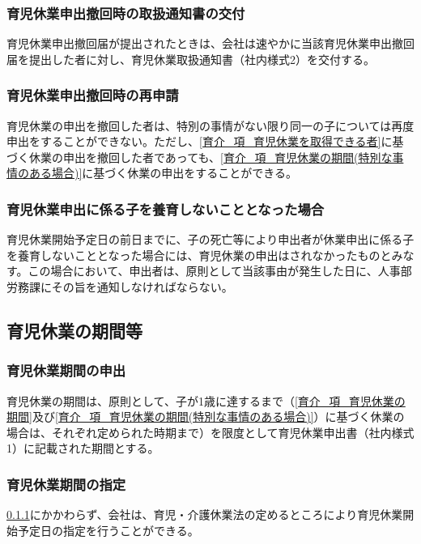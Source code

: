 \documentclass{jsarticle}
\begin{document}
\subsubsection{育児休業申出撤回時の取扱通知書の交付}
\label{育介_項_育児休業申出撤回時の取扱通知書の交付}
育児休業申出撤回届が提出されたときは、会社は速やかに当該育児休業申出撤回届を提出した者に対し、育児休業取扱通知書（社内様式2）を交付する。

\subsubsection{育児休業申出撤回時の再申請}
\label{育介_項_育児休業申出撤回時の再申請}
育児休業の申出を撤回した者は、特別の事情がない限り同一の子については再度申出をすることができない。ただし、\ref{育介_項_育児休業を取得できる者}に基づく休業の申出を撤回した者であっても、\ref{育介_項_育児休業の期間(特別な事情のある場合)}に基づく休業の申出をすることができる。

\subsubsection{育児休業申出に係る子を養育しないこととなった場合}
\label{育介_項_育児休業申出に係る子を養育しないこととなった場合}
育児休業開始予定日の前日までに、子の死亡等により申出者が休業申出に係る子を養育しないこととなった場合には、育児休業の申出はされなかったものとみなす。この場合において、申出者は、原則として当該事由が発生した日に、人事部労務課にその旨を通知しなければならない。

\subsection{育児休業の期間等}
\label{育介_条_育児休業の期間等}

\subsubsection{育児休業期間の申出}
\label{育介_項_育児休業期間の申出}
育児休業の期間は、原則として、子が1歳に達するまで（\ref{育介_項_育児休業の期間}及び\ref{育介_項_育児休業の期間(特別な事情のある場合)}）に基づく休業の場合は、それぞれ定められた時期まで）を限度として育児休業申出書（社内様式1）に記載された期間とする。 

\subsubsection{育児休業期間の指定}
\label{育介_項_育児休業期間の指定}
\ref{育介_項_育児休業期間の申出}にかかわらず、会社は、育児・介護休業法の定めるところにより育児休業開始予定日の指定を行うことができる。
\end{document}
